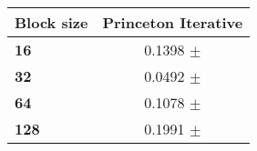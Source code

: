 \begin{tabular}{lc}\toprule
\textbf{Block size}  & \textbf{Princeton Iterative}\\\midrule
\textbf{16}  & 0.1398 $\pm$ \\
\textbf{32}  & 0.0492 $\pm$ \\
\textbf{64}  & 0.1078 $\pm$ \\
\textbf{128} & 0.1991 $\pm$ \\
\bottomrule
\end{tabular}
